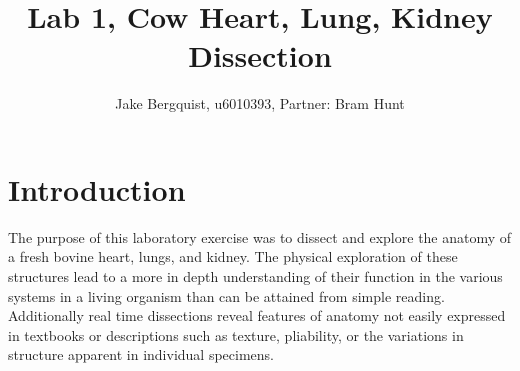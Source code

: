 \documentclass[12pt]{article}
\begin{document}
\title{Lab 1, Cow Heart, Lung, Kidney Dissection}
\author{Jake Bergquist, u6010393, Partner: Bram Hunt}
\maketitle
\tableofcontents
\newpage

\section{Introduction}
\par{}
The purpose of this laboratory exercise was to dissect and explore the anatomy of a fresh bovine heart, lungs, and kidney. The physical exploration of these structures lead to a more in depth understanding of their function in the various systems in a living organism than can be attained from simple reading. Additionally real time dissections reveal features of anatomy not easily expressed in textbooks or descriptions such as texture, pliability, or the variations in structure apparent in individual specimens.
\end{document}
